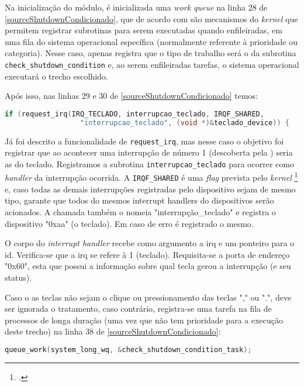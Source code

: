 \documentclass[
	12pt,			
	openright,			%
	twoside,			%
	a4paper,			%
	english,			%
	brazil,				%
	]{abntex2}
\begin{document}
Na inicialização do módulo, é inicializada uma \emph{work queue} na linha 28
de \autoref{sourceShutdownCondicionado}, que de acordo com
\textcite{pierreUnderstandingTheLinuxKernel} são mecanismos do \emph{kernel} que
permitem registrar subrotinas para serem executadas quando enfileiradas, em uma
fila do sistema operacional específica (normalmente referente à prioridade ou
categoria). Nesse caso, apenas registra que o tipo de trabalho será o da
subrotina \lstinline{check_shutdown_condition} e, ao serem enfileiradas tarefas, o
sistema operacional executará o trecho escolhido.

Após isso, nas linhas 29 e 30 de \autoref{sourceShutdownCondicionado} temos:

\begin{lstlisting}[language=C]
  if (request_irq(IRQ_TECLADO, interrupcao_teclado, IRQF_SHARED,
                  "interrupcao_teclado", (void *)&teclado_device)) {
\end{lstlisting}

Já foi descrito a funcionalidade de \lstinline{request_irq}, mas nesse caso o
objetivo foi registrar que ao acontecer uma interrupção de número 1 (descoberta
pela \textcite{interruptsOSDevWiki}) seria as do teclado. Registramos a
subrotina \lstinline{interrupcao_teclado} para ocorrer como \emph{handler} da
interrupção ocorrida. A \lstinline{IRQF_SHARED} é uma \emph{flag} prevista pelo
\emph{kernel} \footcite{interruptHSourceCode} e, caso todas as demais
interrupções registradas pelo dispositivo sejam de mesmo tipo, garante que todos
do mesmos interrupt handlers do dispositivos serão acionados. A chamada também
o nomeia "interrupção\_teclado" e registra o dispositivo "0xaa" (o teclado). Em
caso de erro é registrado o mesmo.

O corpo do \emph{interrupt handler} recebe como argumento a irq e um ponteiro
para o id. Verifica-se que a irq se refere à 1 (teclado). Requisita-se a porta
de endereço "0x60", esta que possui a informação sobre qual tecla gerou a
interrupção (e seu status).

Caso o as teclas não sejam o clique ou pressionamento das teclas "," ou ".",
deve ser ignorada o tratamento, caso contrário, registra-se uma tarefa na fila
de processos de longa duração (uma vez que não tem prioridade para a
execução deste trecho) na linha 38 de \autoref{sourceShutdownCondicionado}:

\begin{lstlisting}[language=C]
  queue_work(system_long_wq, &check_shutdown_condition_task);
\end{lstlisting}
\end{document}
